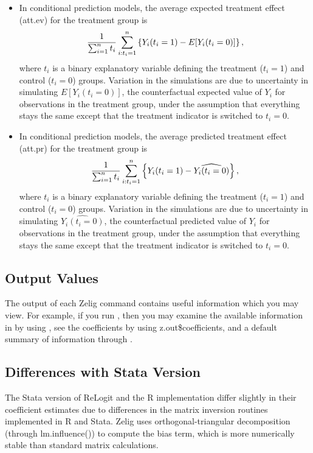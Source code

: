 \documentclass[letterpaper,10pt,english]{sphinxmanual}
\begin{document}
\begin{itemize}
\item {} 
In conditional prediction models, the average expected treatment
effect (att.ev) for the treatment group is
\begin{gather}
\begin{split}\frac{1}{\sum_{i=1}^n t_i}\sum_{i:t_i=1}^n \left\{ Y_i(t_i=1) -
      E[Y_i(t_i=0)] \right\},\end{split}\notag
\end{gather}
where \(t_i\) is a binary explanatory variable defining the
treatment (\(t_i=1\)) and control (\(t_i=0\)) groups.
Variation in the simulations are due to uncertainty in simulating
\(E[Y_i(t_i=0)]\), the counterfactual expected value of
\(Y_i\) for observations in the treatment group, under the
assumption that everything stays the same except that the treatment
indicator is switched to \(t_i=0\).

\item {} 
In conditional prediction models, the average predicted treatment
effect (att.pr) for the treatment group is
\begin{gather}
\begin{split}\frac{1}{\sum_{i=1}^n t_i}\sum_{i:t_i=1}^n \left\{ Y_i(t_i=1) -
      \widehat{Y_i(t_i=0)} \right\},\end{split}\notag
\end{gather}
where \(t_i\) is a binary explanatory variable defining the
treatment (\(t_i=1\)) and control (\(t_i=0\)) groups.
Variation in the simulations are due to uncertainty in simulating
\(\widehat{Y_i(t_i=0)}\), the counterfactual predicted value of
\(Y_i\) for observations in the treatment group, under the
assumption that everything stays the same except that the treatment
indicator is switched to \(t_i=0\).

\end{itemize}


\subsection{Output Values}
\label{vignette:id55}
The output of each Zelig command contains useful information which you
may view. For example, if you run
, then you may examine
the available information in  by using , see
the coefficients by using z.out\$coefficients, and a default summary of
information through .


\subsection{Differences with Stata Version}
\label{vignette:differences-with-stata-version}
The Stata version of ReLogit and the R implementation differ slightly in
their coefficient estimates due to differences in the matrix inversion
routines implemented in R and Stata. Zelig uses orthogonal-triangular
decomposition (through lm.influence()) to compute the bias term, which
is more numerically stable than standard matrix calculations.
\end{document}
